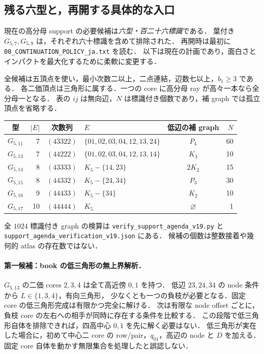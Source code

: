 \subsection{残る六型と，再開する具体的な入口}
\label{ns19:support-agenda}

現在の高分母 support の必要候補は\emph{六型・百二十六標識}である．
葉付き $G_{5,7},G_{5,9}$ は，それぞれ六十標識を含めて排除された．
再開時は最初に \nolinkurl{00_CONTINUATION_POLICY_ja.txt} を読む．
以下は現在の計画であり，面白さとインパクトを最大化するために柔軟に変更する．

全候補は五頂点を使い，最小次数二以上，二点連結，辺数七以上，$b_1\ge3$ である．
各二価頂点は三角形に属する．一つの core に高分母 ray が高々一本なら全分母一となる．
表の $ij$ は無向辺，$N$ は標識付き個数であり，補 graph では孤立頂点を省略する．
\begin{center}
\footnotesize
\setlength{\tabcolsep}{4pt}
\begin{tabular}{crclcr}
型&$|E|$&次数列&$E$&低辺の補 graph&$N$\\\hline
$G_{5,11}$&7&$(43322)$&$\{01,02,03,04,12,13,24\}$&$P_4$&60\\
$G_{5,13}$&7&$(44222)$&$\{01,02,03,04,12,13,14\}$&$K_3$&10\\
$G_{5,14}$&8&$(43333)$&$K_5-\{14,23\}$&$2K_2$&15\\
$G_{5,15}$&8&$(44332)$&$K_5-\{24,34\}$&$P_3$&30\\
$G_{5,16}$&9&$(44433)$&$K_5-\{34\}$&$K_2$&10\\
$G_{5,17}$&10&$(44444)$&$K_5$&$\varnothing$&1
\end{tabular}
\end{center}
全 $1024$ 標識付き graph の検算は
\nolinkurl{verify_support_agenda_v19.py} と
\nolinkurl{support_agenda_verification_v19.json} にある．
候補の個数は整数接着や幾何的 atlas の存在数ではない．

\paragraph{第一候補：book の低三角形の無上界解析．}
$G_{5,13}$ の二価 cores $2,3,4$ は全て高近傍 $0,1$ を持つ．
低辺 $23,24,34$ の node 条件から $L\in\{1,3,4\}$，有向三角形，
少なくとも一つの負枝が必要となる．固定 core の低三角形完成は有限かつ完全に解ける．
次は有限な node offset ごとに，負枝 core の左右への相手が同時に存在する条件を比較する．
この段階で低三角形自体を排除できれば，四高中心 $0,1$ を先に解く必要はない．
低三角形が実在した場合に，初めて中心二 core の row/pair，$q_{01}$，高辺の node と $D$ を加える．
固定 core 自体を動かす無限集合を処理したと誤認しない．

